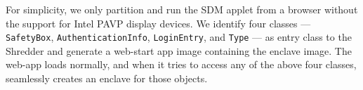 For simplicity, we only partition and run the SDM applet from a browser without the support for Intel PAVP display devices. We identify four classes --- {\tt SafetyBox}, 
{\tt AuthenticationInfo}, {\tt LoginEntry}, and {\tt Type} --- as entry class to the Shredder and generate a web-start app image containing the enclave image. The web-app loads normally, and when it tries to access any of the above four classes, \systemname{} seamlessly creates an enclave for those objects. 


